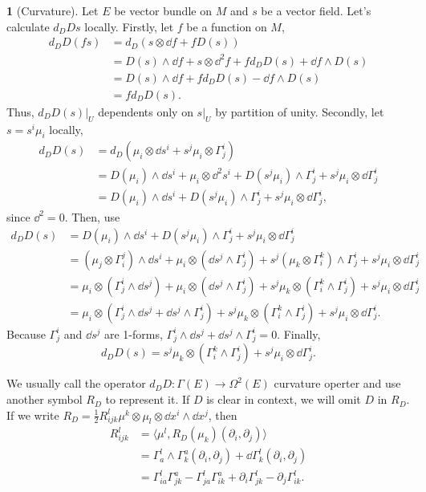 \documentclass[11pt]{article}
\theoremstyle{definition}
\newtheorem{para}{}[part]
\theoremstyle{plain}
\begin{document}
\begin{para}[Curvature]
Let $E$ be vector bundle on $M$ and $s$ be a vector field. Let's calculate $d_DDs$ locally. Firstly, let $f$ be a function on $M$,
\begin{align*}
	d_DD(fs)&=d_D(s\otimes \dd f+fD(s))\\
	&=D(s)\wedge \dd f+s \otimes \dd^2f+fd_DD(s)+\dd f\wedge D(s)\\
	&=D(s)\wedge \dd f+fd_DD(s)-\dd f\wedge D(s)\\
	&=fd_DD(s).
\end{align*}
Thus, $d_DD(s)|_U$ dependents only on $s|_U$ by partition of unity. Secondly, let $s=s^i\mu_i$ locally, 
\begin{align*}
	d_DD(s)&=d_D(\mu_i\otimes \dd s^i+s^j\mu_i\otimes \Gamma^i_j)\\
	&=D(\mu_i)\wedge \dd s^i+\mu_i \otimes \dd^2s^i+D(s^j\mu_i)\wedge \Gamma^i_j+s^j\mu_i\otimes \dd \Gamma^i_j\\
	&=D(\mu_i)\wedge \dd s^i+D(s^j\mu_i)\wedge \Gamma^i_j+s^j\mu_i\otimes \dd \Gamma^i_j,
\end{align*}
since $\dd^2=0$. Then, use
\begin{align*}
	d_DD(s)&=D(\mu_i)\wedge \dd s^i+D(s^j\mu_i)\wedge \Gamma^i_j+s^j\mu_i\otimes \dd \Gamma^i_j\\
	&=(\mu_j\otimes \Gamma^j_i)\wedge \dd s^i+
	\mu_i\otimes(\dd s^j\wedge \Gamma^i_j)+s^j(\mu_k\otimes \Gamma^k_i)\wedge \Gamma^i_j
	+s^j\mu_i\otimes \dd \Gamma^i_j\\
	&=\mu_i\otimes (\Gamma^i_j\wedge \dd s^j)+
	\mu_i\otimes(\dd s^j\wedge \Gamma^i_j)+s^j\mu_k\otimes (\Gamma^k_i\wedge \Gamma^i_j)
	+s^j\mu_i\otimes \dd \Gamma^i_j\\
	&=\mu_i\otimes \left(\Gamma^i_j\wedge \dd s^j+\dd s^j\wedge \Gamma^i_j\right)+s^j\mu_k\otimes (\Gamma^k_i\wedge \Gamma^i_j)
	+s^j\mu_i\otimes \dd \Gamma^i_j.
\end{align*}
Because $\Gamma^i_j$ and $\dd s^j$ are 1-forms, $\Gamma^i_j\wedge \dd s^j+\dd s^j\wedge \Gamma^i_j=0$. Finally,
\[
	d_DD(s)=s^j\mu_k\otimes (\Gamma^k_i\wedge \Gamma^i_j)
	+s^j\mu_i\otimes \dd \Gamma^i_j.
\]

We usually call the operator $d_DD:\Gamma(E)\to \Omega^2(E)$ curvature operter and use another symbol $R_D$ to represent it. If $D$ is clear in context, we will omit $D$ in $R_D$. If we write $R_D=\frac{1}{2}R_{ijk}^l\mu^k\otimes\mu_l\otimes\dd x^i\wedge \dd x^j$, then
\begin{align*}
R_{ijk}^l &= \langle \mu^l,R_D(\mu_k)(\partial_i,\partial_j)\rangle\\
	&=\Gamma^l_a\wedge \Gamma^a_k(\partial_i,\partial_j)
	+\dd \Gamma^l_k(\partial_i,\partial_j)\\
	&=\Gamma^l_{ia}\Gamma^a_{jk}-\Gamma^l_{ja}\Gamma^a_{ik}+\partial_i\Gamma^l_{jk}-\partial_j\Gamma^l_{ik}.
\end{align*}
\end{para}
\end{document}
